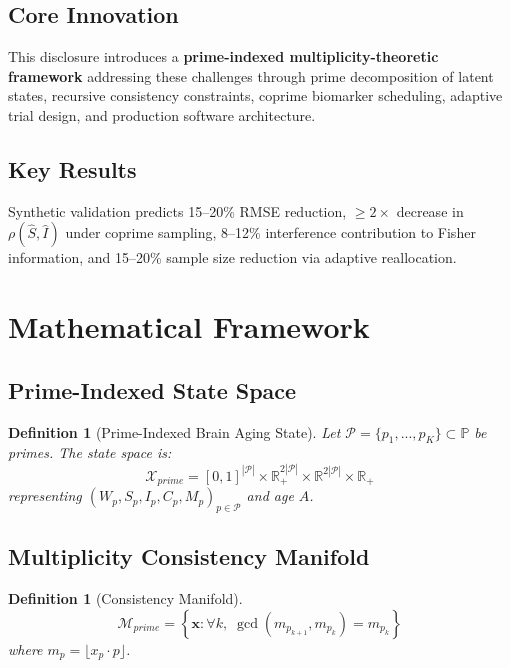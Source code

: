 \documentclass[11pt,letterpaper]{article}
\newtheorem{definition}[theorem]{Definition}
\begin{document}
\subsection{Core Innovation}

This disclosure introduces a \textbf{prime-indexed multiplicity-theoretic framework} addressing these challenges through prime decomposition of latent states, recursive consistency constraints, coprime biomarker scheduling, adaptive trial design, and production software architecture.

\subsection{Key Results}

Synthetic validation predicts 15--20\% RMSE reduction, $\geq 2\times$ decrease in $\rho(\hat{S}, \hat{I})$ under coprime sampling, 8--12\% interference contribution to Fisher information, and 15--20\% sample size reduction via adaptive reallocation.

\section{Mathematical Framework}

\subsection{Prime-Indexed State Space}

\begin{definition}[Prime-Indexed Brain Aging State]
Let $\mathcal{P} = \{p_1, ..., p_K\} \subset \mathbb{P}$ be primes. The state space is:
\[
\mathcal{X}_{prime} = [0,1]^{|\mathcal{P}|} \times \mathbb{R}_+^{2|\mathcal{P}|} \times \mathbb{R}^{2|\mathcal{P}|} \times \mathbb{R}_+
\]
representing $(W_p, S_p, I_p, C_p, M_p)_{p \in \mathcal{P}}$ and age $A$.
\end{definition}

\subsection{Multiplicity Consistency Manifold}

\begin{definition}[Consistency Manifold]
\[
\mathcal{M}_{prime} = \left\{ \mathbf{x} : \forall k, \; \gcd(m_{p_{k+1}}, m_{p_k}) = m_{p_k} \right\}
\]
where $m_p = \lfloor x_p \cdot p \rfloor$.
\end{definition}
\end{document}
